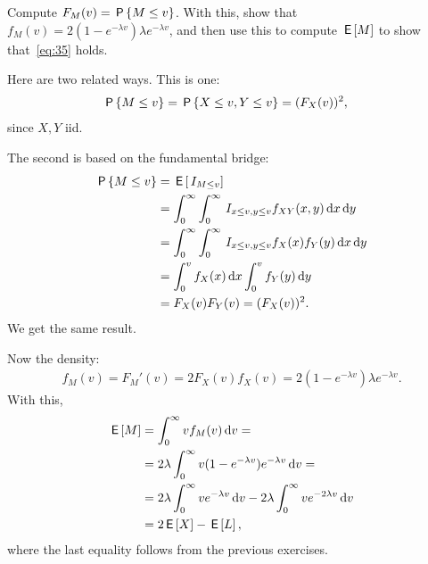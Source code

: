 \documentclass[a4paper,11pt]{article}
\begin{document}
\begin{exercise}\label{ex:6}
Compute $F_M(v) = \P{M\leq v}$. With this, show that  $f_{M}(v)=2(1-e^{-\lambda v}) \lambda e^{-\lambda v}$,  and then use this to compute $\E M$ to show that~\cref{eq:35} holds.
\begin{solution}
Here are two related ways. This is one:
\begin{align}
\P{M\leq v}   &= \P{X \leq v, Y \leq v} = (F_{X}(v))^{2},
\end{align}
since $X, Y$ iid.

The second is based on the fundamental bridge:
\begin{align}
\P{M\leq v}
&= \E{\1{M\leq v}} \\
&=\int_0^{\infty} \int_0^{\infty} \1{x\leq v, y\leq v} f_{XY}(x,y) \d x \d y \\
&= \int_0^{\infty} \int_0^{\infty} \1{x\leq v, y\leq v} f_{X}(x) f_{Y}(y) \d x \d y \\
&= \int_0^{v} f_{X}(x) \d x \int_0^{v}  f_{Y}(y)  \d y \\
&= F_{X}(v) F_Y(v) = (F_X(v))^2.
\end{align}
We get the same result.

Now  the density:
\begin{align}
  \label{eq:26}
  f_M(v) = F_M'(v) = 2 F_X(v) f_X(v) = 2(1-e^{-\lambda v}) \lambda e^{- \lambda v}.
\end{align}
With this,
\begin{align}
  \label{eq:27}
\E M
&= \int_{0}^{\infty} v f_M(v) \d v = \\
&= 2 \lambda \int_{0}^{\infty} v (1-e^{-\lambda v}) e^{-\lambda v} \d v = \\
&= 2 \lambda \int_{0}^{\infty} v e^{-\lambda v} \d v -  2 \lambda \int_{0}^{\infty} v e^{-2 \lambda v} \d v \\
&= 2 \E X - \E L,
\end{align}
where the last equality follows from the previous exercises.
\end{solution}
\end{exercise}
\end{document}
